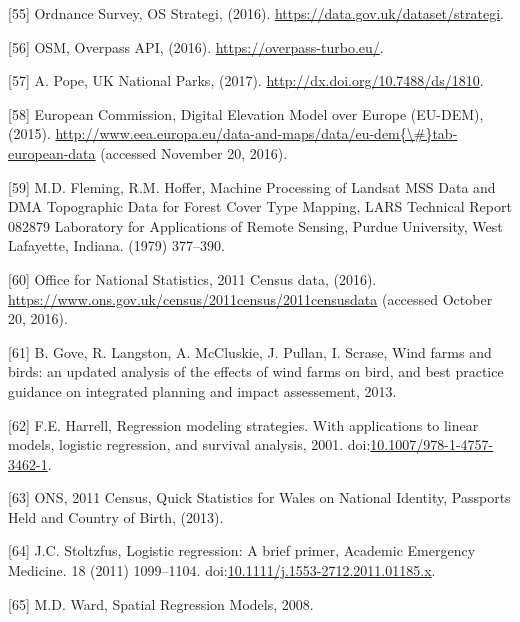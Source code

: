 \documentclass[a4paper,]{article}
\theoremstyle{definition}
\theoremstyle{definition}
\theoremstyle{definition}
\theoremstyle{remark}
\begin{document}
\hypertarget{ref-Survey2016}{}
{[}55{]} Ordnance Survey, OS Strategi, (2016).
\url{https://data.gov.uk/dataset/strategi}.

\hypertarget{ref-Overpass2016}{}
{[}56{]} OSM, Overpass API, (2016). \url{https://overpass-turbo.eu/}.

\hypertarget{ref-Pope2017}{}
{[}57{]} A. Pope, UK National Parks, (2017).
\url{http://dx.doi.org/10.7488/ds/1810}.

\hypertarget{ref-Commission2015}{}
{[}58{]} European Commission, Digital Elevation Model over Europe
(EU-DEM), (2015).
\href{http://www.eea.europa.eu/data-and-maps/data/eu-dem\%7B/\#\%7Dtab-european-data}{http://www.eea.europa.eu/data-and-maps/data/eu-dem\{\textbackslash{}\#\}tab-european-data}
(accessed November 20, 2016).

\hypertarget{ref-Fleming1979}{}
{[}59{]} M.D. Fleming, R.M. Hoffer, Machine Processing of Landsat MSS
Data and DMA Topographic Data for Forest Cover Type Mapping, LARS
Technical Report 082879 Laboratory for Applications of Remote Sensing,
Purdue University, West Lafayette, Indiana. (1979) 377--390.

\hypertarget{ref-OfficeforNationalStatistics}{}
{[}60{]} Office for National Statistics, 2011 Census data, (2016).
\url{https://www.ons.gov.uk/census/2011census/2011censusdata} (accessed
October 20, 2016).

\hypertarget{ref-Gove2013}{}
{[}61{]} B. Gove, R. Langston, A. McCluskie, J. Pullan, I. Scrase, Wind
farms and birds: an updated analysis of the effects of wind farms on
bird, and best practice guidance on integrated planning and impact
assessement, 2013.

\hypertarget{ref-Harrell2001}{}
{[}62{]} F.E. Harrell, Regression modeling strategies. With applications
to linear models, logistic regression, and survival analysis, 2001.
doi:\href{https://doi.org/10.1007/978-1-4757-3462-1}{10.1007/978-1-4757-3462-1}.

\hypertarget{ref-ONS2013}{}
{[}63{]} ONS, 2011 Census, Quick Statistics for Wales on National
Identity, Passports Held and Country of Birth, (2013).

\hypertarget{ref-Stoltzfus2011}{}
{[}64{]} J.C. Stoltzfus, Logistic regression: A brief primer, Academic
Emergency Medicine. 18 (2011) 1099--1104.
doi:\href{https://doi.org/10.1111/j.1553-2712.2011.01185.x}{10.1111/j.1553-2712.2011.01185.x}.

\hypertarget{ref-Ward2008}{}
{[}65{]} M.D. Ward, Spatial Regression Models, 2008.
\end{document}
